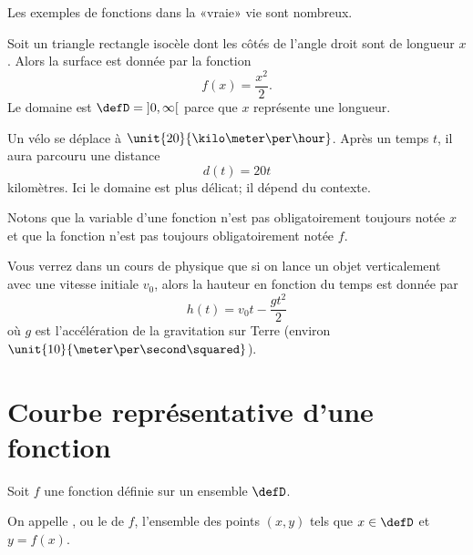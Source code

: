 Les exemples de fonctions dans la «vraie» vie sont nombreux.

\begin{example}
    Soit un triangle rectangle isocèle dont les côtés de l'angle droit sont de longueur \( x\). Alors la surface est donnée par la fonction
    \begin{equation}
        f(x)=\frac{ x^2 }{2}.
    \end{equation}
    Le domaine est \( \defD=\mathopen] 0 , \infty \mathclose[\) parce que \( x\) représente une longueur.
\end{example}

\begin{example}
    Un vélo se déplace à \( \unit{20}{\kilo\meter\per\hour}\). Après un temps \( t\), il aura parcouru une distance
    \begin{equation}
        d(t)=20t
    \end{equation}
    kilomètres. Ici le domaine est plus délicat; il dépend du contexte.

    Notons que la variable d'une fonction n'est pas obligatoirement toujours notée \( x\) et que la fonction n'est pas toujours obligatoirement notée \( f\).
\end{example}

\begin{example}
    Vous verrez dans un cours de physique que si on lance un objet verticalement avec une vitesse initiale \( v_0\), alors la hauteur en fonction du temps est donnée par
    \begin{equation}
        h(t)=v_0t-\frac{ gt^2 }{2}
    \end{equation}
    où \( g\) est l'accélération de la gravitation sur Terre (environ \( \unit{10}{\meter\per\second\squared}\)).
\end{example}

\section{Courbe représentative d'une fonction}

Soit $f$ une fonction définie sur un ensemble $\defD$.

\begin{definition}
    On appelle , ou le  de $f$, l'ensemble des points $(x,y)$ tels que $x\in\defD$ et $y=f(x)$.
\end{definition}

